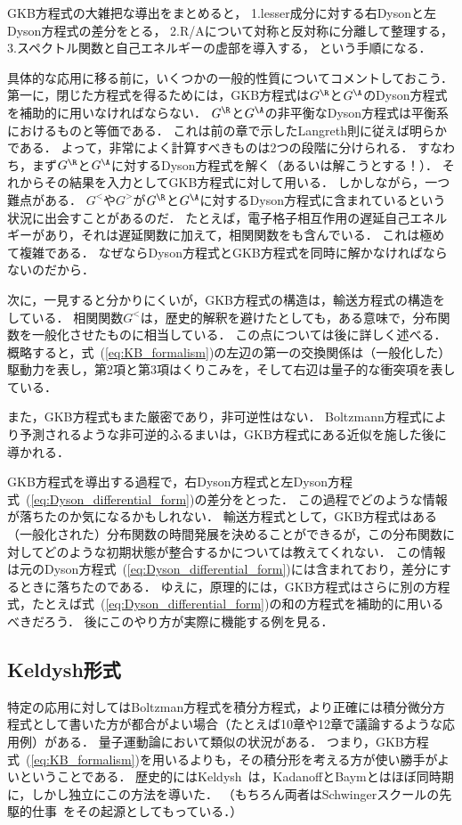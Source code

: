 \documentclass[a4paper,10pt]{jsarticle}
\begin{document}
GKB方程式の大雑把な導出をまとめると，
1.lesser成分に対する右Dysonと左Dyson方程式の差分をとる，
2.R/Aについて対称と反対称に分離して整理する，
3.スペクトル関数と自己エネルギーの虚部を導入する，
という手順になる．

具体的な応用に移る前に，いくつかの一般的性質についてコメントしておこう．
第一に，閉じた方程式を得るためには，GKB方程式は$G^{\R}$と$G^{\A}$のDyson方程式を補助的に用いなければならない．
$G^{\R}$と$G^{\A}$の非平衡なDyson方程式は平衡系におけるものと等価である．
これは前の章で示したLangreth則に従えば明らかである．
よって，非常によく計算すべきものは2つの段階に分けられる．
すなわち，まず$G^{\R}$と$G^{\A}$に対するDyson方程式を解く（あるいは解こうとする！）．
それからその結果を入力としてGKB方程式に対して用いる．
しかしながら，一つ難点がある．
$G^{<}$や$G^{>}$が$G^{\R}$と$G^{\A}$に対するDyson方程式に含まれているという状況に出会すことがあるのだ．
たとえば，電子格子相互作用の遅延自己エネルギーがあり，それは遅延関数に加えて，相関関数をも含んでいる．
これは極めて複雑である．
なぜならDyson方程式とGKB方程式を同時に解かなければならないのだから．

次に，一見すると分かりにくいが，GKB方程式の構造は，輸送方程式の構造をしている．
相関関数$G^{<}$は，歴史的解釈を避けたとしても，ある意味で，分布関数を一般化させたものに相当している．
この点については後に詳しく述べる．
概略すると，式~(\ref{eq:KB_formalism})の左辺の第一の交換関係は（一般化した）駆動力を表し，第2項と第3項はくりこみを，そして右辺は量子的な衝突項を表している．

また，GKB方程式もまた厳密であり，非可逆性はない．
Boltzmann方程式により予測されるような非可逆的ふるまいは，GKB方程式にある近似を施した後に導かれる．

GKB方程式を導出する過程で，右Dyson方程式と左Dyson方程式~(\ref{eq:Dyson_differential_form})の差分をとった．
この過程でどのような情報が落ちたのか気になるかもしれない．
輸送方程式として，GKB方程式はある（一般化された）分布関数の時間発展を決めることができるが，この分布関数に対してどのような初期状態が整合するかについては教えてくれない．
この情報は元のDyson方程式~(\ref{eq:Dyson_differential_form})には含まれており，差分にするときに落ちたのである．
ゆえに，原理的には，GKB方程式はさらに別の方程式，たとえば式~(\ref{eq:Dyson_differential_form})の和の方程式を補助的に用いるべきだろう．
後にこのやり方が実際に機能する例を見る．


\subsection{\label{sec:5.3}Keldysh形式}
特定の応用に対してはBoltzman方程式を積分方程式，より正確には積分微分方程式として書いた方が都合がよい場合（たとえば10章や12章で議論するような応用例）がある．
量子運動論において類似の状況がある．
つまり，GKB方程式~(\ref{eq:KB_formalism})を用いるよりも，その積分形を考える方が使い勝手がよいということである．
歴史的にはKeldysh~\cite{Keldysh}は，KadanoffとBaymとはほぼ同時期に，しかし独立にこの方法を導いた．
（もちろん両者はSchwingerスクールの先駆的仕事~\cite{Bakshi1963a,Bakshi1963b,Schwinger}をその起源としてもっている．）
\end{document}
